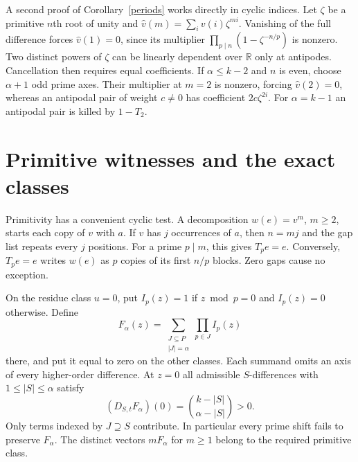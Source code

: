 \documentclass[11pt]{article}
\begin{document}
A second proof of Corollary~\ref{periods} works directly in cyclic
indices. Let \(\zeta\) be a primitive \(n\)th root of unity and
\(\widehat v(m)=\sum_i v(i)\zeta^{mi}\). Vanishing of the full
difference forces \(\widehat v(1)=0\), since its multiplier
\(\prod_{p\mid n}(1-\zeta^{-n/p})\) is nonzero. Two distinct powers
of \(\zeta\) can be linearly dependent over \(\mathbb R\) only at
antipodes. Cancellation then requires equal coefficients. If
\(\alpha\le k-2\) and \(n\) is even, choose \(\alpha+1\) odd prime
axes. Their multiplier at \(m=2\) is nonzero, forcing
\(\widehat v(2)=0\), whereas an antipodal pair of weight \(c\ne0\)
has coefficient \(2c\zeta^{2i}\). For \(\alpha=k-1\) an antipodal
pair is killed by \(1-T_2\).

\section{Primitive witnesses and the exact classes}
Primitivity has a convenient cyclic test. A decomposition
\(w(e)=v^m\), \(m\ge2\), starts each copy of \(v\) with \(a\).
If \(v\) has \(j\) occurrences of \(a\), then \(n=mj\) and the gap
list repeats every \(j\) positions. For a prime \(p\mid m\), this gives
\(T_pe=e\). Conversely, \(T_pe=e\) writes \(w(e)\) as \(p\) copies
of its first \(n/p\) blocks. Zero gaps cause no exception.

On the residue class \(u=0\), put \(I_p(z)=1\) if \(z\bmod p=0\)
and \(I_p(z)=0\) otherwise. Define
\[
 F_\alpha(z)=\sum_{\substack{J\subseteq P\\|J|=\alpha}}
                 \prod_{p\in J} I_p(z)
\]
there, and put it equal to zero on the other classes. Each summand
omits an axis of every higher-order difference. At \(z=0\) all
admissible \(S\)-differences with \(1\le |S|\le\alpha\) satisfy
\[
 (D_{S,t}F_\alpha)(0)=\binom{k-|S|}{\alpha-|S|}>0 .
\]
Only terms indexed by \(J\supseteq S\) contribute. In particular every
prime shift fails to preserve \(F_\alpha\). The distinct vectors
\(mF_\alpha\) for \(m\ge1\) belong to the required primitive class.
\end{document}
